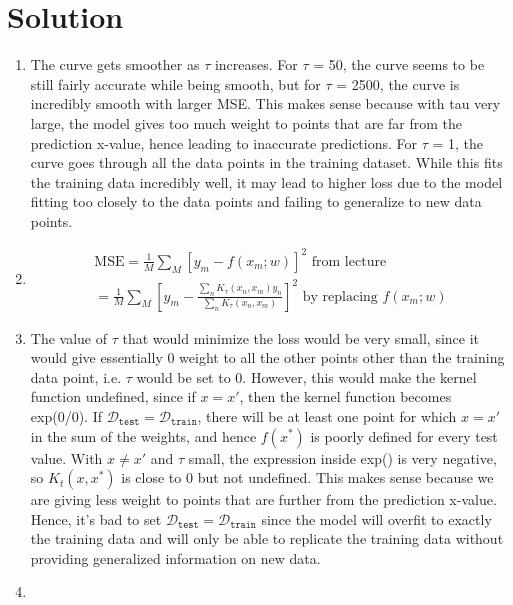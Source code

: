 \documentclass[submit]{harvardml}
\newenvironment{solution}
  {\color{magenta}\section*{Solution}}
{}
\begin{document}
\begin{solution}
\begin{enumerate}
    \item The curve gets smoother as $\tau$ increases. For $\tau$ = 50, the curve seems to be still fairly accurate while being smooth, but for $\tau$ = 2500, the curve is incredibly smooth with larger MSE. This makes sense because with tau very large, the model gives too much weight to points that are far from the prediction x-value, hence leading to inaccurate predictions. For $\tau$ = 1, the curve goes through all the data points in the training dataset. While this fits the training data incredibly well, it may lead to higher loss due to the model fitting too closely to the data points and failing to generalize to new data points. 
    
    \item \begin{equation*}
    \begin{split}
        \text{MSE} = \frac{1}{M}\sum_M\left[y_m - f(x_m; w)\right]^2 \text{ from lecture} \\
        = \frac{1}{M} \sum_M\left[y_m - \frac{\sum_n K_\tau(x_n, x_m)y_n}{\sum_n K_\tau (x_n, x_m)}\right]^2 \text{ by replacing } f(x_m; w)
    \end{split}
    \end{equation*}

    \item The value of $\tau$ that would minimize the loss would be very small, since it would give essentially 0 weight to all the other points other than the training data point, i.e. $\tau$ would be set to 0. However, this would make the kernel function undefined, since if $x=x'$, then the kernel function becomes exp(0/0). If $\mathcal{D}_\texttt{test} = \mathcal{D}_\texttt{train}$, there will be at least one point for which $x=x'$ in the sum of the weights, and hence $f(x^*)$ is poorly defined for every test value. With $x \neq x'$ and $\tau$ small, the expression inside exp() is very negative, so $K_t(x,x^*)$ is close to 0 but not undefined. This makes sense because we are giving less weight to points that are further from the prediction x-value. Hence, it's bad to set $\mathcal{D}_\texttt{test} = \mathcal{D}_\texttt{train}$ since the model will overfit to exactly the training data and will only be able to replicate the training data without providing generalized information on new data. 

    \item 


\end{enumerate}
\end{solution}
\end{document}
